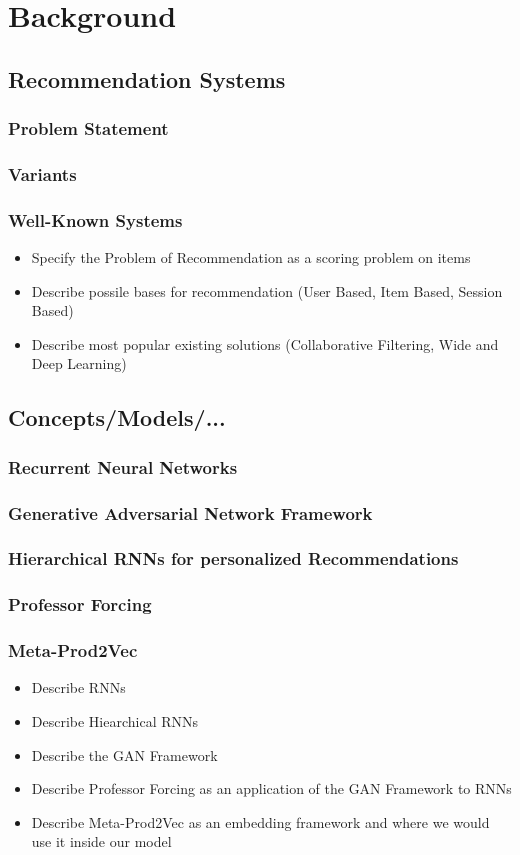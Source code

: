 \chapter{Background}

\section{Recommendation Systems}
\subsection{Problem Statement}
\subsection{Variants}
\subsection{Well-Known Systems}
\begin{itemize}
\item Specify the Problem of Recommendation as a scoring problem on items
\item Describe possile bases for recommendation (User Based, Item Based, Session Based)
\item Describe most popular existing solutions (Collaborative Filtering, Wide and Deep Learning)
\end{itemize}

\section{Concepts/Models/...}
\subsection{Recurrent Neural Networks}
\subsection{Generative Adversarial Network Framework}
\subsection{Hierarchical RNNs for personalized Recommendations}
\cite{hierarchical}
\subsection{Professor Forcing}
\cite{profforce}
\subsection{Meta-Prod2Vec}
\cite{prod2vec}
\begin{itemize}
\item Describe RNNs
\item Describe Hiearchical RNNs
\item Describe the GAN Framework
\item Describe Professor Forcing as an application of the GAN Framework to RNNs
\item Describe Meta-Prod2Vec as an embedding framework and where we would use it inside our model
\end{itemize}

